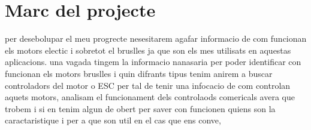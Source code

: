 
\section{Marc del projecte}

per desebolupar el meu progrecte nesesitarem agafar informacio de com funcionan els motors electic i sobretot el bruslles ja que son els mes utilisats en aquestas aplicacions. una vagada tingem la informacio nanasaria per poder identificar con funcionan els motors bruslles i quin difrants tipus tenim anirem a buscar controladors del motor o ESC per tal de tenir una infocacio de com controlan aquets motors, analisam el funcionament dels controlaods comericals avera que trobem i si en tenim algun de obert per saver con funcionen quiens son la caractaristique i per a que son util en el cas que ens conve, 

